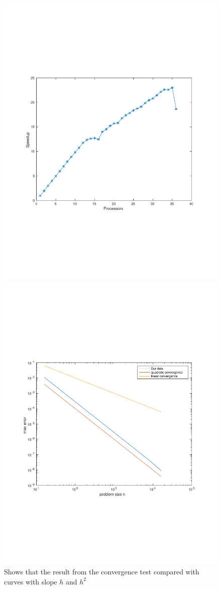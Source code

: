 
\begin{figure}
\centering
\includegraphics[width=0.7\linewidth]{./figures/speedup}
\caption{}
\label{fig:speedup}
\end{figure}


\begin{figure}[h]
\centering
\includegraphics[width=0.7\linewidth]{./figures/checkConv}
\caption{Shows that the result from the convergence test compared with curves with slope $h$ and $h^2$}
\label{fig:checkConv}
\end{figure}

